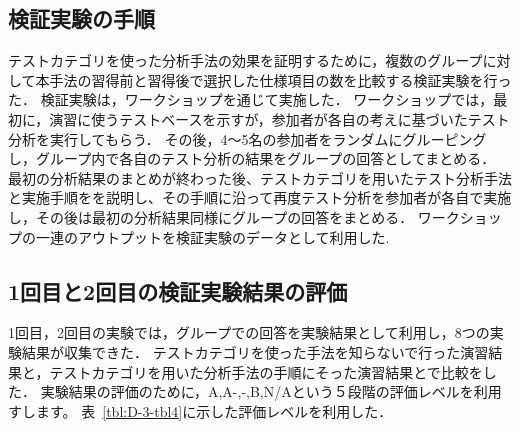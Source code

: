 \documentclass[a4paper,12pt]{jreport}
\begin{document}
\subsection{検証実験の手順}
テストカテゴリを使った分析手法の効果を証明するために，複数のグループに対して本手法の習得前と習得後で選択した仕様項目の数を比較する検証実験を行った．
検証実験は，ワークショップを通じて実施した．
ワークショップでは，最初に，演習に使うテストベースを示すが，参加者が各自の考えに基づいたテスト分析を実行してもらう．
その後，4〜5名の参加者をランダムにグルーピングし，グループ内で各自のテスト分析の結果をグループの回答としてまとめる．
最初の分析結果のまとめが終わった後、テストカテゴリを用いたテスト分析手法と実施手順をを説明し、その手順に沿って再度テスト分析を参加者が各自で実施し，その後は最初の分析結果同様にグループの回答をまとめる．
ワークショップの一連のアウトプットを検証実験のデータとして利用した.
\subsection{1回目と2回目の検証実験結果の評価}
1回目，2回目の実験では，グループでの回答を実験結果として利用し，8つの実験結果が収集できた．
テストカテゴリを使った手法を知らないで行った演習結果と，テストカテゴリを用いた分析手法の手順にそった演習結果とで比較をした．
実験結果の評価のために，A,A-,-,B,N/Aという５段階の評価レベルを利用すします。
表~\ref{tbl:D-3-tbl4}に示した評価レベルを利用した．
\end{document}
